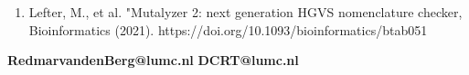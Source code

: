 \documentclass[portrait,a0paper,fontscale=0.31]{baposter}
\begin{document}
\begin{poster}

   {
    \tiny
    \begin{enumerate}[itemsep=-0.3ex,leftmargin=0.29cm]
      \item Lefter, M., et al. "Mutalyzer 2: next generation HGVS nomenclature checker, Bioinformatics (2021). https://doi.org/10.1093/bioinformatics/btab051
    \end{enumerate}
  }

  {
  \begin{center}
  \textbf{RedmarvandenBerg@lumc.nl}\linebreak
  \textbf{DCRT@lumc.nl}\linebreak
  \end{center}
  }


  {
  \vspace{-0.3em}
  \begin{center}
  \end{center}
  }
\end{poster}
\end{document}
